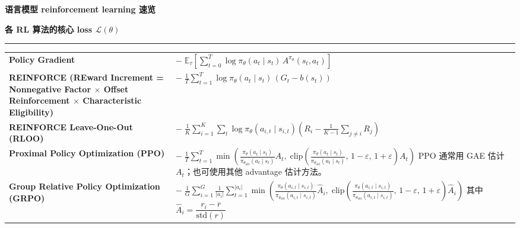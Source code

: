\documentclass[9pt]{extarticle}
\begin{document}
\vspace*{\fill}
\begin{center}
{\Large\bfseries 语言模型 reinforcement learning 速览}
\end{center}

\vspace{4pt}
{\centering\textbf{各 RL 算法的核心 loss $\mathcal{L}(\theta)$}\par}
\vspace{2pt}
\hrule
\vspace{6pt}

\begin{center}
\begin{tabularx}{0.92\textwidth}{>{\raggedright\arraybackslash\bfseries}p{5.8cm} @{\quad} X}

Policy Gradient
&
$\displaystyle -\;\mathbb{E}_\tau\!\left[\sum_{t=0}^{T} \log \pi_\theta(a_t\mid s_t)\, A^{\pi_\theta}(s_t, a_t)\right]$
\\[22pt]

REINFORCE
\newline\mdseries\scriptsize (REward Increment =
Nonnegative Factor $\times$
Offset Reinforcement $\times$
Characteristic Eligibility)
&
$\displaystyle -\;\frac{1}{T}\sum_{t=1}^{T}\log \pi_\theta(a_t\mid s_t)\,(G_t - b(s_t))$
\\[22pt]

REINFORCE Leave-One-Out
\newline\mdseries (RLOO)
&
$\displaystyle -\;\frac{1}{K}\sum_{i=1}^{K}\sum_t \log \pi_\theta(a_{i,t}\mid s_{i,t})\!\left(R_i - \frac{1}{K\!-\!1}\sum_{j\neq i}R_j\right)$
\\[22pt]

Proximal Policy Optimization
\newline\mdseries (PPO)
&
$\displaystyle -\;\frac{1}{T}\sum_{t=1}^{T}\min\!\left(\frac{\pi_\theta(a_t\mid s_t)}{\pi_{\theta_{\text{old}}}(a_t\mid s_t)} A_t,\; \mathrm{clip}\!\left(\frac{\pi_\theta(a_t\mid s_t)}{\pi_{\theta_{\text{old}}}(a_t\mid s_t)},\, 1\!-\!\varepsilon,\, 1\!+\!\varepsilon\right) A_t\right)$
\newline
{\scriptsize PPO 通常用 GAE 估计 $A_t$；也可使用其他 advantage 估计方法。}
\\[20pt]

Group Relative Policy Optimization
\newline\mdseries (GRPO)
&
$\displaystyle -\;\frac{1}{G}\sum_{i=1}^{G}\frac{1}{|a_i|}\sum_{t=1}^{|a_i|}\min\!\left(\frac{\pi_\theta(a_{i,t}\mid s_{i,t})}{\pi_{\theta_{\text{old}}}(a_{i,t}\mid s_{i,t})} \hat{A}_i,\; \mathrm{clip}\!\left(\frac{\pi_\theta(a_{i,t}\mid s_{i,t})}{\pi_{\theta_{\text{old}}}(a_{i,t}\mid s_{i,t})},\, 1\!-\!\varepsilon,\, 1\!+\!\varepsilon\right) \hat{A}_i\right)$
\newline
其中 $\hat{A}_i = \dfrac{r_i - \overline{r}}{\mathrm{std}(r)}$
\\[40pt]


\end{tabularx}
\end{center}
\end{document}
